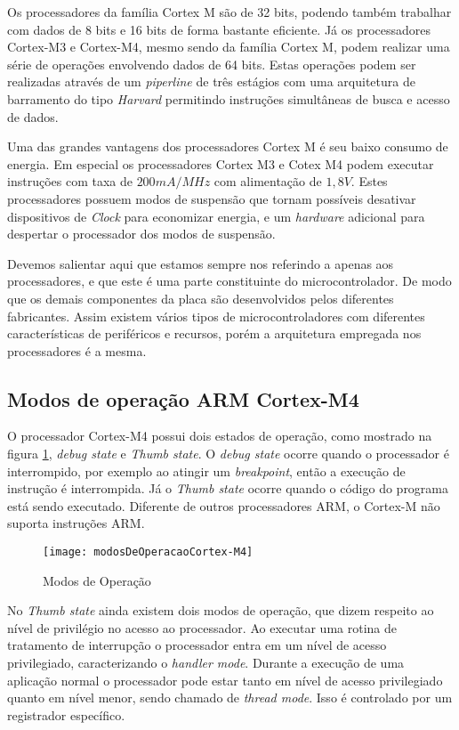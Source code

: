 Os processadores da família Cortex M são de 32 bits, podendo também trabalhar com dados de 8 bits e 16 bits de forma bastante eficiente. Já os processadores Cortex-M3  e Cortex-M4, mesmo sendo da família Cortex M, podem realizar uma série de operações envolvendo dados de 64 bits. Estas operações podem ser realizadas através de um \emph{piperline} de três estágios com uma arquitetura de barramento do tipo \emph{Harvard} permitindo instruções simultâneas de busca e acesso de dados.

Uma das grandes vantagens dos processadores Cortex M é seu baixo consumo de energia. Em especial os processadores Cortex M3 e Cotex M4 podem executar instruções com taxa de $200 mA/MHz$ com alimentação de $1,8 V$. Estes processadores possuem modos de suspensão que tornam possíveis desativar dispositivos de \emph{Clock} para economizar energia, e um \emph{hardware} adicional para despertar o processador dos modos de suspensão.

Devemos salientar aqui que estamos sempre nos referindo a apenas aos processadores, e que este é uma parte constituinte do microcontrolador. De modo que os demais componentes da placa são desenvolvidos pelos diferentes fabricantes. Assim existem vários tipos de microcontroladores com diferentes características de periféricos e recursos, porém a arquitetura empregada nos processadores é a mesma.


\subsection{Modos de operação ARM Cortex-M4}

O processador Cortex-M4 possui dois estados de operação, como mostrado na figura \ref{fig:modosDeOperacao}, \emph{debug state} e \emph{Thumb state}. O \emph{debug state} ocorre quando o processador é interrompido, por exemplo ao atingir um \emph{breakpoint}, então a execução de instrução é interrompida. Já o \emph{Thumb state} ocorre quando o código do programa está sendo executado. Diferente de outros processadores ARM, o Cortex-M não suporta instruções ARM.

\begin{figure}[H]
	\centering
	\texttt{[image: modosDeOperacaoCortex-M4]}
	\caption{Modos de Operação \cite{DATASHEET_TIVA}}
	\label{fig:modosDeOperacao}
\end{figure}

No \emph{Thumb state} ainda existem dois modos de operação, que dizem respeito ao nível de privilégio no acesso ao processador. Ao executar uma rotina de tratamento de interrupção o processador entra em um nível de acesso privilegiado, caracterizando o \emph{handler mode}. Durante a execução de uma aplicação normal o processador pode estar tanto em nível de acesso privilegiado quanto em nível menor, sendo chamado de \emph{thread mode}. Isso é controlado por um registrador específico. 

